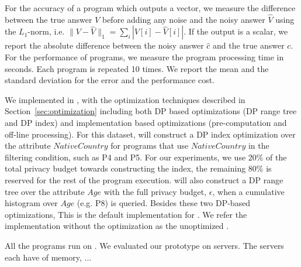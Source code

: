  For the accuracy of a program which outputs a vector, we measure the difference between the true answer $V$ before adding any noise and the noisy answer $\hat{V}$ using the $L_1$-norm, i.e. $\|V-\hat{V}\|_1 = \sum_{i} |V[i]-\hat{V}[i]|$. If the output is a scalar, we report the absolute difference between the noisy answer $\hat{c}$ and the true answer $c$. For the performance of \system programs, we measure the program processing time in seconds. Each program is repeated 10 times. We report the mean and the standard deviation for the error and the performance cost.

 We implemented  \system in , with the optimization techniques described in Section~\ref{sec:optimization} including both DP based optimizations (DP range tree and DP index) and implementation based optimizations (pre-computation and off-line processing). For this dataset, \system will construct a DP index optimization over the attribute $NativeCountry$ for programs that use $NativeCountry$ in the filtering condition, such as P4 and P5. For our experiments, we use $20\%$ of the total privacy budget towards constructing the index, the remaining $80\%$ is reserved for the rest of the program execution. \system will also construct a DP range tree over the attribute $Age$ with the full privacy budget, $\epsilon$, when a cumulative histogram over $Age$ (e.g. P8) is queried. Besides these two DP-based optimizations,
This is the default implementation for \system.  We refer the implementation without the optimization as the unoptimized \system.

All the programs run on . We evaluated our prototype on  servers. The servers each have  of memory, ... 

